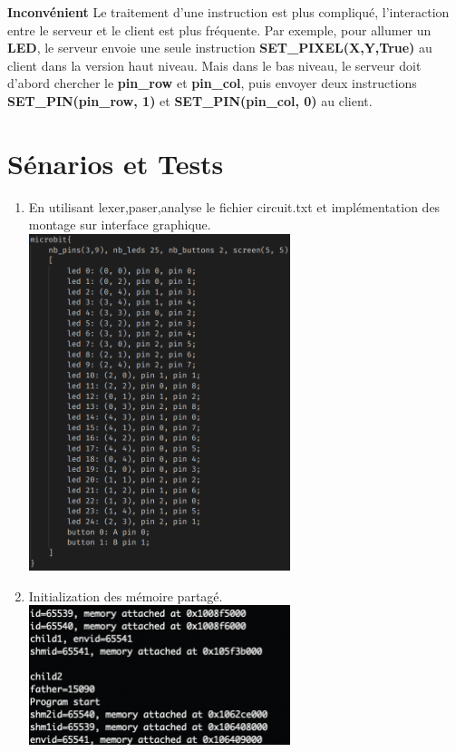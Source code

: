 \documentclass[14px]{article}
\begin{document}
\textbf{Inconvénient}
Le traitement d'une instruction est plus compliqué, l'interaction entre le serveur et le client est plus fréquente. Par exemple, pour allumer un \textbf{LED}, le serveur envoie une seule instruction \textbf{SET\_PIXEL(X,Y,True)} au client dans la version haut niveau. Mais dans le bas niveau, le serveur doit d'abord chercher le \textbf{pin\_row} et \textbf{pin\_col}, puis envoyer deux instructions \textbf{SET\_PIN(pin\_row, 1)} et \textbf{SET\_PIN(pin\_col, 0)} au client.

\clearpage

\section{Sénarios et Tests}
\begin{enumerate}

	\item En utilisant lexer,paser,analyse le fichier circuit.txt et implémentation des montage sur interface graphique.\\
	\centering
	\includegraphics[width=0.6\textwidth]{circuit.png}\\[1cm]

	\item Initialization des mémoire partagé.\\
	\centering
	\includegraphics[width=0.6\textwidth]{sharememoire.png}\\[1cm]


\end{enumerate}
\end{document}
